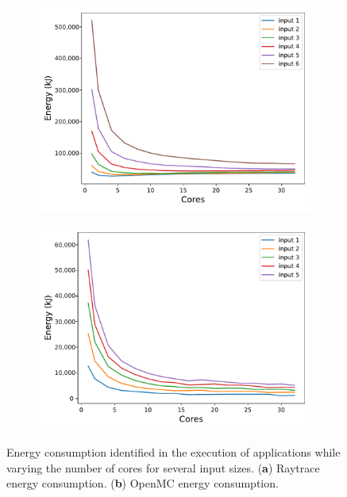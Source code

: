 \unskip
\begin{figure}[H]
	\begin{subfigure}[b]{0.46\textwidth}
		\includegraphics[width=\textwidth]{pascalanalyzer/figures/results/energy_completo_rtview_2 (1).pdf}
		\label{fig:raytrace_en}
	\end{subfigure}
	\begin{subfigure}[b]{0.46\textwidth}
		\includegraphics[width=\textwidth]{pascalanalyzer/figures/results/energy_completo_openmc_kernel_novo (1).pdf}
		\label{fig:openmc_en}
	\end{subfigure}
	
	\caption{Energy consumption identified in the execution of applications while varying the number of cores for several input sizes.
		(\textbf{a}) Raytrace energy consumption. (\textbf{b}) OpenMC energy consumption.}
	\label{fig:energy}
\end{figure}
